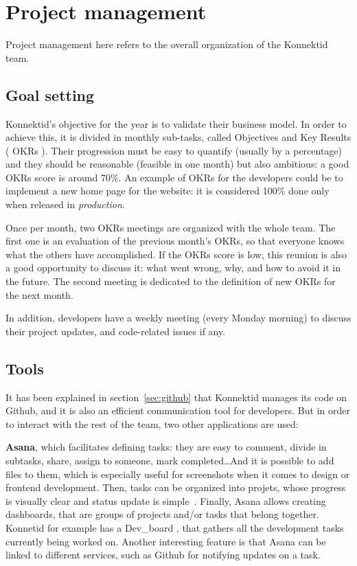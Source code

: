 \section{Project management}
\label{sec:management}

Project management here refers to the overall organization of the Konnektid team.

\subsection{Goal setting}
\label{ssec:goalSetting}

Konnektid's objective for the year is to validate their business model. In order to achieve this, it is divided in monthly sub-tasks, called Objectives and Key Results (\guillemotleft{} OKRs \guillemotright{}). Their progression must be easy to quantify (usually by a percentage) and they should be reasonable (feasible in one month) but also ambitious: a good OKRs score is around 70\%. An example of OKRs for the developers could be to implement a new home page for the website: it is considered 100\% done only when released in \textit{production}.

Once per month, two OKRs meetings are organized with the whole team. The first one is an evaluation of the previous month's OKRs, so that everyone knows what the others have accomplished. If the OKRs score is low, this reunion is also a good opportunity to discuss it: what went wrong, why, and how to avoid it in the future. The second meeting is dedicated to the definition of new OKRs for the next month.

In addition, developers have a weekly meeting (every Monday morning) to discuss their project updates, and code-related issues if any.

\subsection{Tools}
\label{ssec:tools}

It has been explained in {\sc section}~\ref{sec:github} that Konnektid manages its code on Github, and it is also an efficient communication tool for developers. But in order to interact with the rest of the team, two other applications are used:

\textbf{Asana}, which facilitates defining tasks: they are easy to comment, divide in subtasks, share, assign to someone, mark completed\ldots And it is possible to add files to them, which is especially useful for screenshots when it comes to design or frontend development. Then, tasks can be organized into projets, whose progress is visually clear and status update is simple~\cite{asana}. Finally, Asana allows creating dashboards, that are groups of projects and/or tasks that belong together. Konnetid for example has a \guillemotleft{} Dev\_board \guillemotright{}, that gathers all the development tasks currently being worked on. Another interesting feature is that Asana can be linked to different services, such as Github for notifying updates on a task.

